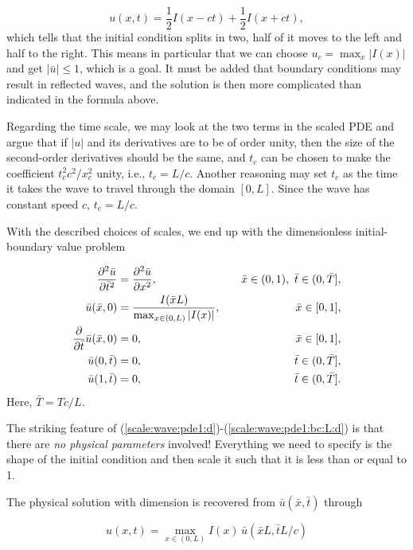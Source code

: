 \documentclass[graybox,envcountchap,sectrefs,final]{svmonodo}
\begin{document}
\[
u(x,t) = \frac{1}{2}I(x-ct) + \frac{1}{2}I(x+ct),
\]
which tells that the initial condition splits in two, half of it moves
to the left and half to the right.
This means in particular that we can choose $u_c=\max_x |I(x)|$
and get $|\bar u|\leq 1$, which is a goal. It must be added that
boundary conditions may result in reflected waves, and the solution is
then more complicated than indicated in the formula above.

Regarding the time scale, we may look at the two terms in the scaled
PDE and argue that if $|u|$ and its derivatives are to be of order unity,
then the size of the second-order derivatives should be the same, and
$t_c$ can be chosen to make the coefficient $t_c^2 c^2 /x_c^2$ unity,
i.e., $t_c=L/c$.
Another reasoning may set $t_c$ as the time it takes the wave
to travel through the domain $[0,L]$. Since the wave has constant
speed $c$, $t_c = L/c$.

With the described choices of scales,
we end up with the dimensionless initial-boundary value problem

\begin{align}
\frac{\partial^2 \bar u}{\partial \bar t^2} &=
{\partial^2 \bar u\over\partial x^2}, \quad & \bar x\in (0,1),\ \bar t\in (0,\bar T],
\label{scale:wave:pde1:d}\\ 
\bar u(\bar x,0) &= \frac{I(\bar x L)}{\max_{x\in(0,L)} |I(x)|},
\quad &\bar x\in [0,1],
\label{scale:wave:pde1:ic:u:d}\\ 
{\partial\over\partial \bar t}\bar u(\bar x,0) &= 0,
\quad & \bar x\in [0,1],
\label{scale:wave:pde1:ic:ut:d}\\ 
\bar u(0,\bar t) & = 0,
\quad  &\bar t\in (0,\bar T],
\label{scale:wave:pde1:bc:0:d}\\ 
\bar u(1,\bar t) & = 0,
\quad  &\bar t\in (0,\bar T].
\label{scale:wave:pde1:bc:L:d}
\end{align}
Here, $\bar T = Tc/L$.

The striking feature of
(\ref{scale:wave:pde1:d})-(\ref{scale:wave:pde1:bc:L:d})
is that there are \emph{no physical parameters} involved! Everything we need
to specify is the shape of the initial condition and then scale it
such that it is less than or equal to 1.

The physical solution with dimension is recovered from $\bar u(\bar x,\bar t)$
through

\begin{equation}
u(x,t) = \max_{x\in(0,L)}I(x)\,\bar u(\bar x L, \bar t L/c)
\end{equation}
\end{document}
